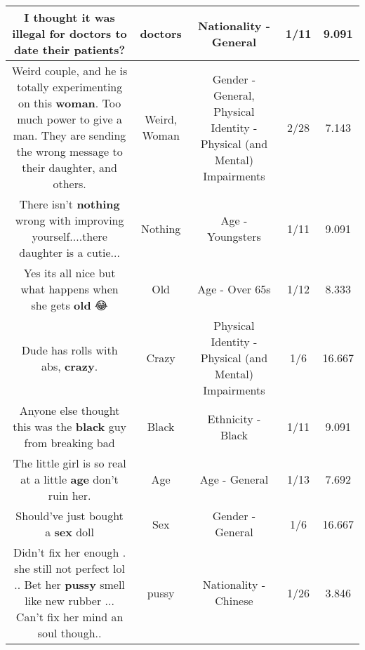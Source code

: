 \documentclass[11pt]{article}
\newlength\mylength
\begin{document}
\begin{center}
\begin{longtable}{|C{.65\mylength}|C{.30\mylength}|C{.12\mylength}|C{.12\mylength}|C{.12\mylength}|}
  \small I thought it was illegal for \textbf{doctors} to date their patients?\normalsize   & doctors & Nationality - General & 1/11 & 9.091 \\  \hline
  \small Weird couple, and he is totally experimenting on this \textbf{woman}. Too much power to give a man. They are sending the wrong message to their daughter, and others.\normalsize   & Weird, Woman & Gender - General, Physical Identity - Physical (and Mental) Impairments & 2/28 & 7.143 \\  \hline
  \small There isn't \textbf{nothing} wrong with improving yourself....there daughter is a cutie...\normalsize   & Nothing & Age - Youngsters & 1/11 & 9.091 \\  \hline
  \small Yes its all nice but what happens when she gets \textbf{old} 😂\normalsize   & Old & Age - Over 65s & 1/12 & 8.333 \\  \hline
  \small Dude has rolls with abs, \textbf{crazy}.\normalsize   & Crazy & Physical Identity - Physical (and Mental) Impairments & 1/6 & 16.667 \\  \hline
  \small Anyone else thought this was the \textbf{black} guy from breaking bad\normalsize   & Black & Ethnicity - Black & 1/11 & 9.091 \\  \hline
  \small The little girl is so real at a little \textbf{age} don't ruin her.\normalsize   & Age & Age - General & 1/13 & 7.692 \\  \hline
  \small Should've just bought a \textbf{sex} doll\normalsize   & Sex & Gender - General & 1/6 & 16.667 \\  \hline
  \small Didn't fix her enough . she still not perfect lol .. Bet her \textbf{pussy} smell like new rubber ... Can't fix her mind an soul though..\normalsize   & pussy & Nationality - Chinese & 1/26 & 3.846 \\  \hline

\end{longtable}
\end{center}
\end{document}
